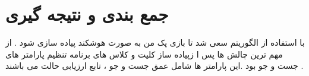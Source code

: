 \chapter{جمع بندی و نتیجه گیری}
با استفاده از الگوریتم   سعی شد تا بازی پک من  به صورت هوشکند پیاده سازی شود . از مهم ترین چالش ها پس ا زپیاده ساز کلیت و کلاس های برنامه تنظیم پارامتر های جست و جو بود .این پارامتر ها شامل عمق جست و جو ، تابع ارزیابی حالت می باشند .